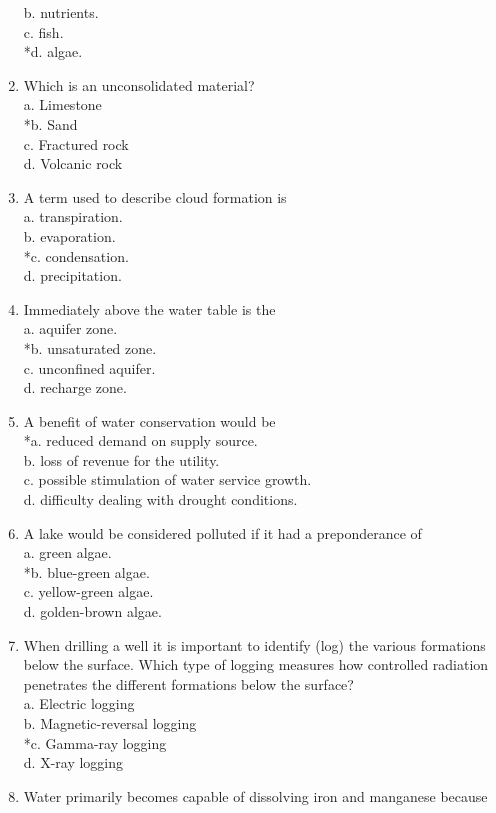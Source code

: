 \begin{enumerate}
b. nutrients.\\
c. fish.\\
*d. algae.
\item Which is an unconsolidated material?\\
a. Limestone\\
*b. Sand\\
c. Fractured rock\\
d. Volcanic rock\\
\item A term used to describe cloud formation is\\
a. transpiration.\\
b. evaporation.\\
*c. condensation.\\
d. precipitation.\\
\item Immediately above the water table is the\\
a. aquifer zone.\\
*b. unsaturated zone.\\
c. unconfined aquifer.\\
d. recharge zone.
\item A benefit of water conservation would be\\
*a. reduced demand on supply source.\\
b. loss of revenue for the utility.\\
c. possible stimulation of water service growth.\\
d. difficulty dealing with drought conditions.\\
\item A lake would be considered polluted if it had a preponderance of\\
a. green algae.\\
*b. blue-green algae.\\
c. yellow-green algae.\\
d. golden-brown algae.\\
\item When drilling a well it is important to identify (log) the various formations below the surface. Which type of logging measures how controlled radiation penetrates the different formations below the surface?\\
a. Electric logging\\
b. Magnetic-reversal logging\\
*c. Gamma-ray logging\\
d. X-ray logging\\
\item Water primarily becomes capable of dissolving iron and manganese because\\

\end{enumerate}
